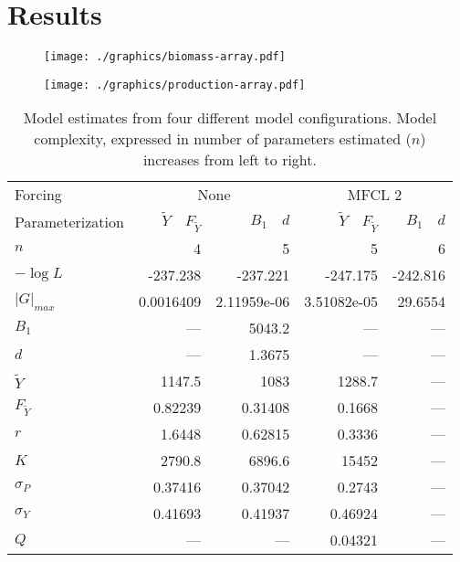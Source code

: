 \documentclass[12pt,letterpaper,twoside]{article}
\newcommand\MSY{\tilde{Y}}
\newcommand\Fmsy{F_{\MSY}}
\begin{document}
\section{Results}

\begin{figure}
\begin{center}
\texttt{[image: ./graphics/biomass-array.pdf]}
\caption{\label{fig:estbiomass}
}
\end{center}
\end{figure}

\begin{figure}
\begin{center}
\texttt{[image: ./graphics/production-array.pdf]}
\caption{\label{fig:estprod}
}
\end{center}
\end{figure}

\begin{table}
\caption{Model estimates from four different model configurations.
Model complexity, expressed in number of parameters estimated ($n$)
increases from left to right.
\label{tag:ests4}}
\begin{center}
\begin{tabular}{lrrrr}
\hline
Forcing & \multicolumn{2}{c}{None}&\multicolumn{2}{c}{MFCL 2}\\
\cline{2-3}\cline{4-5}
Parameterization&$\MSY\quad\Fmsy$&$B_1\quad d$&$\MSY\quad\Fmsy$&$B_1\quad d$\\
\hline
\hline
$n$ & 4 & 5 & 5 & 6\\
$-\log L$ & -237.238 & -237.221 & -247.175 & -242.816\\
$|G|_{max}$ & 0.0016409 & 2.11959e-06 & 3.51082e-05 & 29.6554\\
$B_1$ & --- & 5043.2 & --- & ---\\
$d$ & --- & 1.3675 & --- & ---\\
$\MSY$ & 1147.5 & 1083 & 1288.7 & ---\\
$\Fmsy$ & 0.82239 & 0.31408 & 0.1668 & ---\\
$r$ & 1.6448 & 0.62815 & 0.3336 & ---\\
$K$ & 2790.8 & 6896.6 & 15452 & ---\\
$\sigma_P$ & 0.37416 & 0.37042 & 0.2743 & ---\\
$\sigma_Y$ & 0.41693 & 0.41937 & 0.46924 & ---\\
$Q$ & --- & --- & 0.04321 & ---\\
\hline
\end{tabular}
\end{center}
\end{table}
\end{document}
